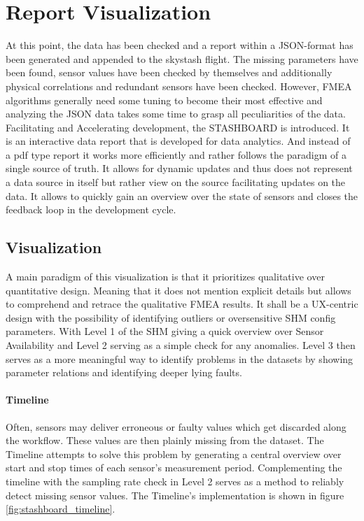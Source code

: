 \newpage


\section{Report Visualization}

At this point, the data has been checked and a report within a JSON-format has been generated and appended to the skystash flight. The missing parameters have been found, sensor values have been checked by themselves and additionally physical correlations and redundant sensors have been checked. However, FMEA algorithms generally need some tuning to become their most effective and analyzing the JSON data takes some time to grasp all peculiarities of the data. Facilitating and Accelerating development, the STASHBOARD is introduced. It is an interactive data report that is developed for data analytics. And instead of a pdf type report it works more efficiently and rather follows the paradigm of a single source of truth. It allows for dynamic updates and thus does not represent a data source in itself but rather view on the source facilitating updates on the data. It allows to quickly gain an overview over the state of sensors and closes the feedback loop in the development cycle.

\subsection{Visualization}
\label{chap:4-visualization}
A main paradigm of this visualization is that it prioritizes qualitative over quantitative design. Meaning that it does not mention explicit details but allows to comprehend and retrace the qualitative FMEA results. It shall be a UX-centric design with the possibility of identifying outliers or oversensitive SHM config parameters. With Level 1 of the SHM giving a quick overview over Sensor Availability and Level 2 serving as a simple check for any anomalies. Level 3 then serves as a more meaningful way to identify problems in the datasets by showing parameter relations and identifying deeper lying faults.

\paragraph{Timeline}

Often, sensors may deliver erroneous or faulty values which get discarded along the workflow. These values are then plainly missing from the dataset. The Timeline attempts to solve this problem by generating a central overview over start and stop times of each sensor's measurement period. Complementing the timeline with the sampling rate check in Level 2 serves as a method to reliably detect missing sensor values. The Timeline's implementation is shown in figure \ref{fig:stashboard_timeline}.

